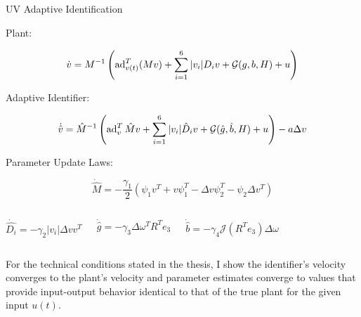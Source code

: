 
\begin{frame}{UV Adaptive Identification}

  Plant:
  \vspace*{-5mm}

  \begin{equation*}
    \dot{v}=M^{-1}\left(\operatorname{ad}_{v(t)}^T(M v)+\sum_{i=1}^6 |v_i|D_i
    v+\mathcal{G}(g,b,H)+u\right)
  \end{equation*}
  \vspace*{-5mm}

  Adaptive Identifier:

  \vspace*{-5mm}

  \begin{equation*}
    \dot{\hat{v}}=\hat{M}^{-1}\left( \operatorname{ad}_v^T\hat{M}v
    +\sum_{i=1}^6 |v_i|\hat{D}_i v+\mathcal{G}(\hat{g},\hat{b},H)
    + u\right)- a \Delta v  
  \end{equation*}

  Parameter Update Laws:


  \begin{equation*}
    \dot{\hat{M}}=-\frac{\gamma_1}{2}\left(\psi_1 v^T 
    +v \psi_1^T-\Delta v \psi_2^T-\psi_2 \Delta v^T\right) 
  \end{equation*}

  \vspace*{-5mm}

  \begin{columns}


    \begin{equation*}
      \dot{\hat{D_i}}=-\gamma_2|v_i|\Delta v v^T
    \end{equation*}


    \begin{equation*}
      \dot{\hat{g}}=-\gamma_3\Delta \omega^T R^T e_3
    \end{equation*}


    \begin{equation*}
      \dot{\hat{b}}=-\gamma_4\mathcal{J}(R^T e_3)\Delta \omega
    \end{equation*}

  \end{columns} 

  \vspace*{5mm}

  
  \alert<2->{For the technical conditions stated in the thesis, I show
    the identifier's velocity converges to the plant's velocity and
    parameter estimates converge to values that provide input-output
    behavior identical to that of the true plant for the given input
    $u(t)$.}

\end{frame}

